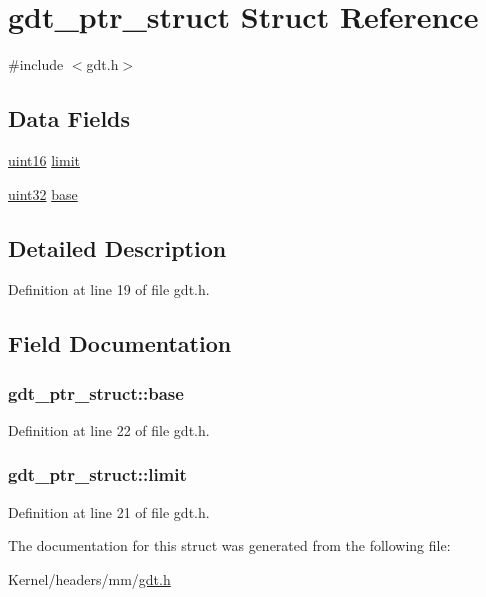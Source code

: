 \hypertarget{structgdt__ptr__struct}{
\section{gdt\_\-ptr\_\-struct Struct Reference}
\label{structgdt__ptr__struct}
}


{\ttfamily \#include $<$gdt.h$>$}

\subsection*{Data Fields}
\begin{DoxyCompactItemize}
\item 
\hyperlink{int__types_8h_a05f6b0ae8f6a6e135b0e290c25fe0e4e}{uint16} \hyperlink{structgdt__ptr__struct_a61128753bc0abcfc34b61ab3ad67e4ea}{limit}
\item 
\hyperlink{int__types_8h_a1134b580f8da4de94ca6b1de4d37975e}{uint32} \hyperlink{structgdt__ptr__struct_ae53964a97bb4f1629cf7a66b42594c6c}{base}
\end{DoxyCompactItemize}


\subsection{Detailed Description}


Definition at line 19 of file gdt.h.



\subsection{Field Documentation}
\hypertarget{structgdt__ptr__struct_ae53964a97bb4f1629cf7a66b42594c6c}{
\subsubsection[{base}]{ {\bf gdt\_\-ptr\_\-struct::base}}}
\label{structgdt__ptr__struct_ae53964a97bb4f1629cf7a66b42594c6c}


Definition at line 22 of file gdt.h.

\hypertarget{structgdt__ptr__struct_a61128753bc0abcfc34b61ab3ad67e4ea}{
\subsubsection[{limit}]{ {\bf gdt\_\-ptr\_\-struct::limit}}}
\label{structgdt__ptr__struct_a61128753bc0abcfc34b61ab3ad67e4ea}


Definition at line 21 of file gdt.h.



The documentation for this struct was generated from the following file:\begin{DoxyCompactItemize}
\item 
Kernel/headers/mm/\hyperlink{gdt_8h}{gdt.h}\end{DoxyCompactItemize}
